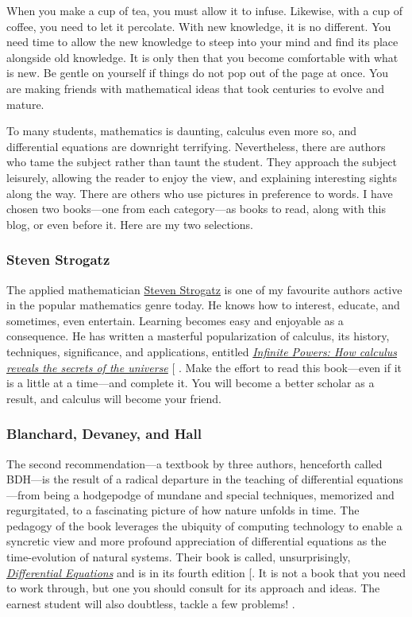 \documentclass[
  a4paper,
]{article}
\begin{document}
When you make a cup of tea, you must allow it to infuse. Likewise, with
a cup of coffee, you need to let it percolate. With new knowledge, it is
no different. You need time to allow the new knowledge to steep into
your mind and find its place alongside old knowledge. It is only then
that you become comfortable with what is new. Be gentle on yourself if
things do not pop out of the page at once. You are making friends with
mathematical ideas that took centuries to evolve and mature.

To many students, mathematics is daunting, calculus even more so, and
differential equations are downright terrifying. Nevertheless, there are
authors who tame the subject rather than taunt the student. They
approach the subject leisurely, allowing the reader to enjoy the view,
and explaining interesting sights along the way. There are others who
use pictures in preference to words. I have chosen two books---one from
each category---as books to read, along with this blog, or even before
it. Here are my two selections.

\subsubsection{Steven Strogatz}\label{steven-strogatz}

The applied mathematician
\href{https://en.wikipedia.org/wiki/Steven_Strogatz}{Steven Strogatz} is
one of my favourite authors active in the popular mathematics genre
today. He knows how to interest, educate, and sometimes, even entertain.
Learning becomes easy and enjoyable as a consequence. He has written a
masterful popularization of calculus, its history, techniques,
significance, and applications, entitled
\href{https://www.stevenstrogatz.com/books/infinite-powers}{\emph{Infinite
Powers: How calculus reveals the secrets of the universe}}
{[}\citeproc{ref-strogatz-2019}{1}{]} . Make the effort to read this
book---even if it is a little at a time---and complete it. You will
become a better scholar as a result, and calculus will become your
friend.

\subsubsection{Blanchard, Devaney, and
Hall}\label{blanchard-devaney-and-hall}

The second recommendation---a textbook by three authors, henceforth
called BDH---is the result of a radical departure in the teaching of
differential equations---from being a hodgepodge of mundane and special
techniques, memorized and regurgitated, to a fascinating picture of how
nature unfolds in time. The pedagogy of the book leverages the ubiquity
of computing technology to enable a syncretic view and more profound
appreciation of differential equations as the time-evolution of natural
systems. Their book is called, unsurprisingly,
\href{http://math.bu.edu/odes/4ed-TOC.html}{\emph{Differential
Equations}} and is in its fourth edition
{[}\citeproc{ref-blanchard-devaney-hall-2012}{2}{]}. It is not a book
that you need to work through, but one you should consult for its
approach and ideas. The earnest student will also doubtless, tackle a
few problems!  \normalfont.
\end{document}
